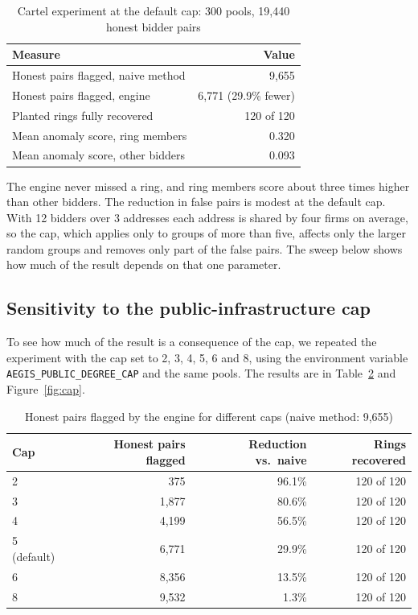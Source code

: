\begin{table}[htbp]
\centering
\caption{Cartel experiment at the default cap: 300 pools, 19{,}440 honest bidder pairs}
\label{tab:cartel}
\small
\begin{tabular}{@{}lr@{}}
\toprule
\textbf{Measure} & \textbf{Value} \\
\midrule
Honest pairs flagged, naive method & 9{,}655 \\
Honest pairs flagged, engine & 6{,}771 (29.9\% fewer) \\
Planted rings fully recovered & 120 of 120 \\
Mean anomaly score, ring members & 0.320 \\
Mean anomaly score, other bidders & 0.093 \\
\bottomrule
\end{tabular}
\end{table}

The engine never missed a ring, and ring members score about three times higher than other bidders. The reduction in false pairs is modest at the default cap. With 12 bidders over 3 addresses each address is shared by four firms on average, so the cap, which applies only to groups of more than five, affects only the larger random groups and removes only part of the false pairs. The sweep below shows how much of the result depends on that one parameter.

\subsection{Sensitivity to the public-infrastructure cap}
To see how much of the result is a consequence of the cap, we repeated the experiment with the cap set to 2, 3, 4, 5, 6 and 8, using the environment variable \texttt{AEGIS\_PUBLIC\_DEGREE\_CAP} and the same pools. The results are in Table~\ref{tab:cap} and Figure~\ref{fig:cap}.

\begin{table}[htbp]
\centering
\caption{Honest pairs flagged by the engine for different caps (naive method: 9{,}655)}
\label{tab:cap}
\small
\begin{tabular}{@{}lrrr@{}}
\toprule
\textbf{Cap} & \textbf{Honest pairs flagged} & \textbf{Reduction vs.\ naive} & \textbf{Rings recovered} \\
\midrule
2 & 375 & 96.1\% & 120 of 120 \\
3 & 1{,}877 & 80.6\% & 120 of 120 \\
4 & 4{,}199 & 56.5\% & 120 of 120 \\
5 (default) & 6{,}771 & 29.9\% & 120 of 120 \\
6 & 8{,}356 & 13.5\% & 120 of 120 \\
8 & 9{,}532 & 1.3\% & 120 of 120 \\
\bottomrule
\end{tabular}
\end{table}

